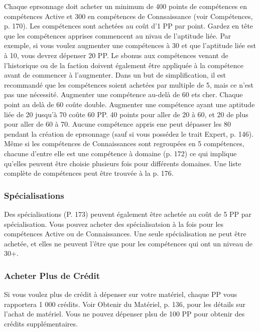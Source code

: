 Chaque eprsonnage doit acheter un minimum de 400 points de compétences en compétences Active et 300 en compétences de Connsaissance (voir Compétences, p. 170). Les compétences sont achetées au coût d'1 PP par point. Gardez en tête que les compétences apprises commencent au nivau de l'aptitude liée. Par exemple, si vous voulez augmenter une compétences à 30 et que l'aptitude liée est à 10, vous devrez dépenser 20 PP. Le sbonus aux compétences venant de l'historique ou de la faction doivent également être appliquée à la compétence avant de commencer à l'augmenter. Dans un but de simplification, il est recommandé que les compétences soient achetées par multiple de 5, mais ce n'est pas une nécessité. Augmenter une compétence au-delà de 60 ets cher. Chaque point au delà de 60 coûte double. Augmenter une compétence ayant une aptitude liée de 20 jusqu'à 70 coûte 60 PP. 40 points pour aller de 20 à 60, et 20 de plus pour aller de 60 à 70. Aucune compétence appris ene peut dépasser les 80 pendant la création de eprsonnage (sauf si vous possédez le trait Expert, p. 146). Même si les compétences de Connaissances sont regroupées en 5 compétences, chacune d'entre elle est une compétence à domaine (p. 172) ce qui implique qu'elles peuvent être choisie plusieurs fois pour différents domaines. Une liste complète de compétences peut être trouvée à la p. 176. 

\subsubsection{Spécialisations} \label{sec:buying-specializations} 

Des spécialisations (P. 173) peuvent également être achetée au coût de 5 PP par spécialisation. Vous pouvez acheter des spécialisatsion à la fois pour les compétences Active ou de Connaissances. Une seule spécialisation ne peut être achetée, et elles ne peuvent l'être que pour les compétences qui ont un niveau de 30+. 

\subsubsection{Acheter Plus de Crédit} \label{sec:buying-credit} 

Si vous voulez plus de crédit à dépenser sur votre matériel, chaque PP vous rapportera 1 000 crédits. Voir Obtenir du Matériel, p. 136, pour les détails sur l'achat de matériel. Vous ne pouvez dépenser plsu de 100 PP pour obtenir des crédits supplémentaires. 

